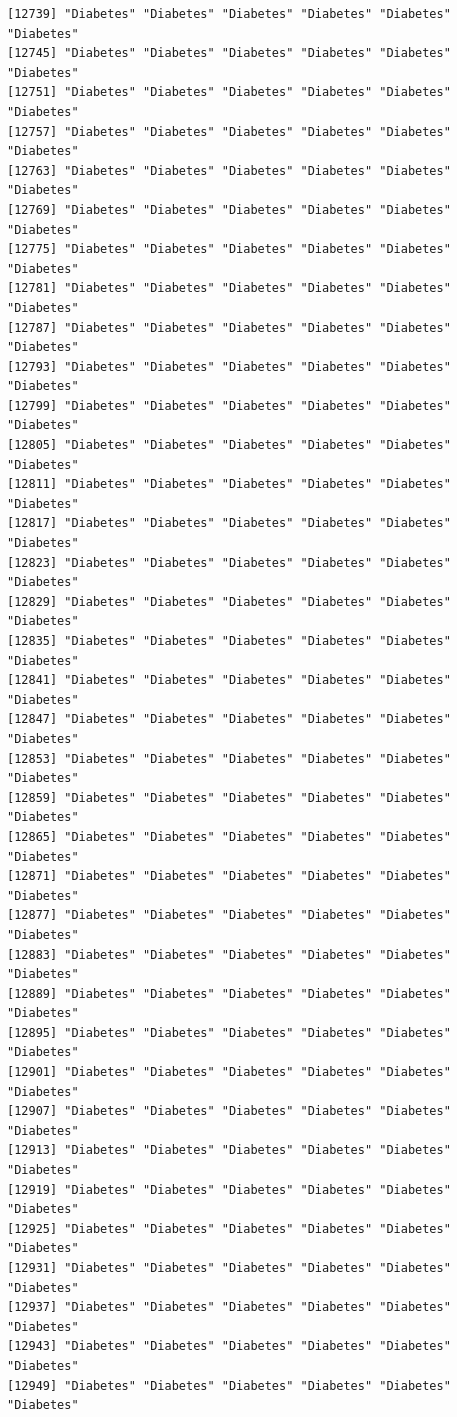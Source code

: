 \documentclass[
  letterpaper,
  DIV=11,
  numbers=noendperiod]{scrartcl}
\begin{document}
\begin{verbatim}
[12739] "Diabetes" "Diabetes" "Diabetes" "Diabetes" "Diabetes" "Diabetes"
[12745] "Diabetes" "Diabetes" "Diabetes" "Diabetes" "Diabetes" "Diabetes"
[12751] "Diabetes" "Diabetes" "Diabetes" "Diabetes" "Diabetes" "Diabetes"
[12757] "Diabetes" "Diabetes" "Diabetes" "Diabetes" "Diabetes" "Diabetes"
[12763] "Diabetes" "Diabetes" "Diabetes" "Diabetes" "Diabetes" "Diabetes"
[12769] "Diabetes" "Diabetes" "Diabetes" "Diabetes" "Diabetes" "Diabetes"
[12775] "Diabetes" "Diabetes" "Diabetes" "Diabetes" "Diabetes" "Diabetes"
[12781] "Diabetes" "Diabetes" "Diabetes" "Diabetes" "Diabetes" "Diabetes"
[12787] "Diabetes" "Diabetes" "Diabetes" "Diabetes" "Diabetes" "Diabetes"
[12793] "Diabetes" "Diabetes" "Diabetes" "Diabetes" "Diabetes" "Diabetes"
[12799] "Diabetes" "Diabetes" "Diabetes" "Diabetes" "Diabetes" "Diabetes"
[12805] "Diabetes" "Diabetes" "Diabetes" "Diabetes" "Diabetes" "Diabetes"
[12811] "Diabetes" "Diabetes" "Diabetes" "Diabetes" "Diabetes" "Diabetes"
[12817] "Diabetes" "Diabetes" "Diabetes" "Diabetes" "Diabetes" "Diabetes"
[12823] "Diabetes" "Diabetes" "Diabetes" "Diabetes" "Diabetes" "Diabetes"
[12829] "Diabetes" "Diabetes" "Diabetes" "Diabetes" "Diabetes" "Diabetes"
[12835] "Diabetes" "Diabetes" "Diabetes" "Diabetes" "Diabetes" "Diabetes"
[12841] "Diabetes" "Diabetes" "Diabetes" "Diabetes" "Diabetes" "Diabetes"
[12847] "Diabetes" "Diabetes" "Diabetes" "Diabetes" "Diabetes" "Diabetes"
[12853] "Diabetes" "Diabetes" "Diabetes" "Diabetes" "Diabetes" "Diabetes"
[12859] "Diabetes" "Diabetes" "Diabetes" "Diabetes" "Diabetes" "Diabetes"
[12865] "Diabetes" "Diabetes" "Diabetes" "Diabetes" "Diabetes" "Diabetes"
[12871] "Diabetes" "Diabetes" "Diabetes" "Diabetes" "Diabetes" "Diabetes"
[12877] "Diabetes" "Diabetes" "Diabetes" "Diabetes" "Diabetes" "Diabetes"
[12883] "Diabetes" "Diabetes" "Diabetes" "Diabetes" "Diabetes" "Diabetes"
[12889] "Diabetes" "Diabetes" "Diabetes" "Diabetes" "Diabetes" "Diabetes"
[12895] "Diabetes" "Diabetes" "Diabetes" "Diabetes" "Diabetes" "Diabetes"
[12901] "Diabetes" "Diabetes" "Diabetes" "Diabetes" "Diabetes" "Diabetes"
[12907] "Diabetes" "Diabetes" "Diabetes" "Diabetes" "Diabetes" "Diabetes"
[12913] "Diabetes" "Diabetes" "Diabetes" "Diabetes" "Diabetes" "Diabetes"
[12919] "Diabetes" "Diabetes" "Diabetes" "Diabetes" "Diabetes" "Diabetes"
[12925] "Diabetes" "Diabetes" "Diabetes" "Diabetes" "Diabetes" "Diabetes"
[12931] "Diabetes" "Diabetes" "Diabetes" "Diabetes" "Diabetes" "Diabetes"
[12937] "Diabetes" "Diabetes" "Diabetes" "Diabetes" "Diabetes" "Diabetes"
[12943] "Diabetes" "Diabetes" "Diabetes" "Diabetes" "Diabetes" "Diabetes"
[12949] "Diabetes" "Diabetes" "Diabetes" "Diabetes" "Diabetes" "Diabetes"

\end{verbatim}
\end{document}
